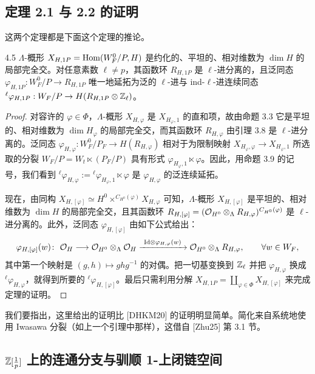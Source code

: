 \subsection{定理 2.1 与 2.2 的证明}

这两个定理都是下面这个定理的推论。

\begin{thm}{4.5}\label{thm:dat-4-5}
$\Lambda$-概形 $X_{H,1P}=\operatorname{Hom}(W^0_F/P,H)$ 是约化的、平坦的、相对维数为 $\dim H$ 的局部完全交。对任意素数 $\ell\neq p$，其函数环 $R_{H,1P}$ 是 $\ell$-进分离的，且泛同态 $\varphi_{H,1P}:W^0_F/P\to R_{H,1P}$ 唯一地延拓为泛的 $\ell$-进与 ind-$\ell$-进连续同态 ${}^\ell\varphi_{H,1P}:W_F/P\to H(R_{H,1P}\otimes\mathbb{Z}_\ell)$。
\end{thm}

\begin{proof}
对容许的 $\varphi\in\Phi$，$\Lambda$-概形 $X_{H,\varphi}$ 是 $X_{H_\varphi,1}$ 的直和项，故由命题 3.3 它是平坦的、相对维数为 $\dim H_\varphi$ 的局部完全交，而其函数环 $R_{H,\varphi}$ 由引理 3.8 是 $\ell$-进分离的。泛同态 $\varphi_{H,\varphi}:W^0_F/P_F\to H(R_{H,\varphi})$ 相对于为限制映射 $X_{H_\varphi,\varphi}\to X_{H_\varphi,1}$ 所选取的分裂 $W_F/P=W_t\ltimes(P_F/P)$ 具有形式 $\varphi_{H_\varphi,1}\ltimes\varphi$。因此，用命题 3.9 的记号，我们看到 ${}^\ell\varphi_{H,\varphi}:={}^\ell\varphi_{H_\varphi,1}\ltimes\varphi$ 是 $\varphi_{H,\varphi}$ 的泛连续延拓。

现在，由同构 $X_{H,[\varphi]}\simeq H^0\times^{C_{H^0}(\varphi)}X_{H,\varphi}$ 可知，$\Lambda$-概形 $X_{H,[\varphi]}$ 是平坦的、相对维数为 $\dim H$ 的局部完全交，且其函数环 $R_{H,[\varphi]}=(\mathcal{O}_{H^0}\otimes_\Lambda R_{H,\varphi})^{C_{H^0}(\varphi)}$ 是 $\ell$-进分离的。此外，泛同态 $\varphi_{H,[\varphi]}$ 由如下公式给出：
\[
\varphi_{H,[\varphi]}(w)\colon\ \OO_H\longrightarrow\OO_{H^0}\otimes_\Lambda\OO_H
\xrightarrow{\ \mathrm{Id}\otimes\varphi_{H,\varphi}(w)\ }\OO_{H^0}\otimes_\Lambda R_{H,\varphi},
\qquad \forall w\in W_F,
\]
其中第一个映射是 $(g,h)\mapsto ghg^{-1}$ 的对偶。把一切基变换到 $\mathbb{Z}_\ell$ 并把 $\varphi_{H,\varphi}$ 换成 ${}^\ell\varphi_{H,\varphi}$，就得到所要的 ${}^\ell\varphi_{H,[\varphi]}$。最后只需利用分解 $X_{H,1P}=\coprod_{\varphi\in\Phi}X_{H,[\varphi]}$ 来完成定理的证明。
\end{proof}

我们要指出，这里给出的证明比 [DHKM20] 的证明明显简单。简化来自系统地使用 Iwasawa 分裂（如上一个引理中那样），这借自 [Zhu25] 第 3.1 节。

\subsection{$\overline{\mathbb{Z}}[\frac1p]$ 上的连通分支与驯顺 1-上闭链空间}

